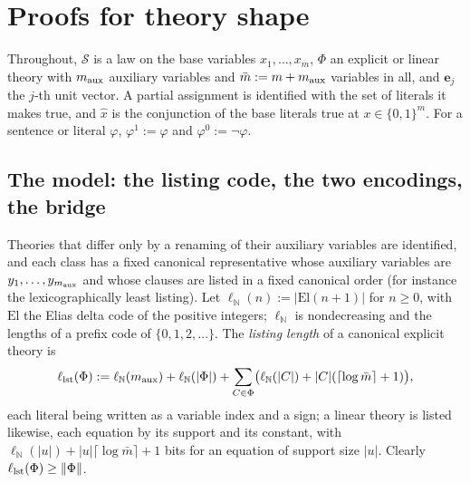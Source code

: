 \section{Proofs for theory shape}\label{app:shape}

Throughout, $\mathcal S$ is a law on the base variables $x_1,\dots,x_m$, $\Phi$ an explicit or linear theory with $m_{\rm aux}$ auxiliary variables and $\bar m:=m+m_{\rm aux}$ variables in all, and $\mathbf e_j$ the $j$-th unit vector. A partial assignment is identified with the set of literals it makes true, and $\hat x$ is the conjunction of the base literals true at $x\in\{0,1\}^m$. For a sentence or literal $\varphi$, $\varphi^1:=\varphi$ and $\varphi^0:=\neg\varphi$.

\subsection{The model: the listing code, the two encodings, the bridge}\label{app:shape:setting}

Theories that differ only by a renaming of their auxiliary variables are identified, and each class has a fixed canonical representative whose auxiliary variables are $y_1,\dots,y_{m_{\rm aux}}$ and whose clauses are listed in a fixed canonical order (for instance the lexicographically least listing). Let $\ell_{\mathbb N}(n):=\lvert\mathrm{El}(n+1)\rvert$ for $n\ge0$, with $\mathrm{El}$ the Elias delta code of the positive integers; $\ell_{\mathbb N}$ is nondecreasing and the lengths of a prefix code of $\{0,1,2,\dots\}$. The \emph{listing length} of a canonical explicit theory is
\begin{equation}\label{eq:shape:lst}
\ell_{\rm lst}(\Phi):=\ell_{\mathbb N}(m_{\rm aux})+\ell_{\mathbb N}(\lvert\Phi\rvert)+\sum_{C\in\Phi}\bigl(\ell_{\mathbb N}(\lvert C\rvert)+\lvert C\rvert(\lceil\log\bar m\rceil+1)\bigr),
\end{equation}
each literal being written as a variable index and a sign; a linear theory is listed likewise, each equation by its support and its constant, with $\ell_{\mathbb N}(\lvert u\rvert)+\lvert u\rvert\lceil\log\bar m\rceil+1$ bits for an equation of support size $\lvert u\rvert$. Clearly $\ell_{\rm lst}(\Phi)\ge\lVert\Phi\rVert$.

